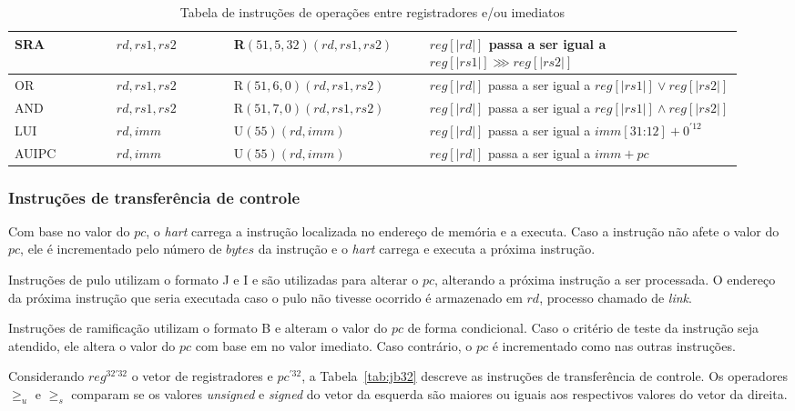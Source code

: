 \begin{table}
\begin{tabular}{ |p{0.13\linewidth}||p{0.15\linewidth}|p{0.25\linewidth}|p{0.40\linewidth}| }
SRA & $rd, rs1, rs2$ & R$(51, 5, 32)(rd, rs1, rs2)$ & $reg[|rd|]$ passa a ser igual a ${reg[|rs1|] \ggg reg[|rs2|]}$ \\ \hline
OR & $rd, rs1, rs2$ & R$(51, 6, 0)(rd, rs1, rs2)$ & $reg[|rd|]$ passa a ser igual a ${reg[|rs1|] \lor reg[|rs2|]}$ \\ \hline
AND & $rd, rs1, rs2$ & R$(51, 7, 0)(rd, rs1, rs2)$ & $reg[|rd|]$ passa a ser igual a ${reg[|rs1|] \land reg[|rs2|]}$ \\ \hline
LUI & $rd, imm$ & U$(55)(rd, imm)$ & $reg[|rd|]$ passa a ser igual a ${imm[31\text{:}12] + 0^{'12}}$ \\ \hline
AUIPC & $rd, imm$ & U$(55)(rd, imm)$ & $reg[|rd|]$ passa a ser igual a ${imm + pc}$ \\ \hline

    \end{tabular}
  \caption{Tabela de instruções de operações entre registradores e/ou imediatos \label{tab:op32}}
  \end{table}

\subsubsection{Instruções de transferência de controle}
\label{ssec:jmp}

  Com base no valor do $pc$, o \emph{hart} carrega a instrução localizada no endereço de memória
  e a executa. Caso a instrução não afete o valor do $pc$, ele é incrementado pelo número
  de $bytes$ da instrução e o \emph{hart} carrega e executa a próxima instrução.

  Instruções de pulo utilizam o formato J e I e são utilizadas para alterar o $pc$, 
  alterando a próxima instrução a ser processada. O endereço da próxima instrução que
  seria executada caso o pulo não tivesse ocorrido é armazenado em $rd$, processo chamado de \emph{link}.

  Instruções de ramificação utilizam o formato B e alteram o valor do $pc$ de forma condicional. Caso o critério de teste
  da instrução seja atendido, ele altera o valor do $pc$ com base em no valor imediato. Caso contrário,
  o $pc$ é incrementado como nas outras instruções.

  Considerando $reg^{32'32}$ o vetor de registradores e $pc^{'32}$, a
  Tabela~\ref{tab:jb32} descreve as instruções de transferência de controle.
  Os operadores $\geq_u$ e $\geq_s$ comparam se os valores \emph{unsigned} e \emph{signed} do vetor da 
  esquerda são maiores ou iguais aos respectivos valores do vetor da direita.

